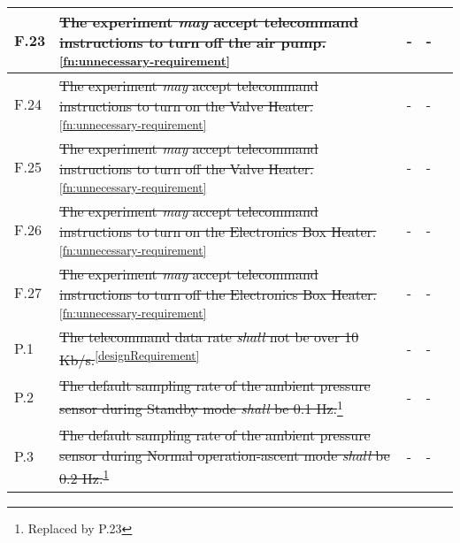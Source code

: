 \begin{longtable}[]{|m{}| m{} |m{} |m{}|m{}|}
F.23 & \st{The experiment \textit{may} accept telecommand instructions to turn off the air pump.}\textsuperscript{\ref{fn:unnecessary-requirement}}                                                                                             &      -       & -            &        \\ \hline
F.24 & \st{The experiment \textit{may} accept telecommand instructions to turn on the Valve Heater.}\textsuperscript{\ref{fn:unnecessary-requirement}}                                                                                          &      -        & -            &        \\ \hline
F.25 & \st{The experiment \textit{may} accept telecommand instructions to turn off the Valve Heater.}\textsuperscript{\ref{fn:unnecessary-requirement}}                                                                                         &      -        & -            &        \\ \hline
F.26 & \st{The experiment \textit{may} accept telecommand instructions to turn on the Electronics Box Heater.}\textsuperscript{\ref{fn:unnecessary-requirement}}                                                                                     &      -        & -            &        \\ \hline
F.27 & \st{The experiment \textit{may} accept telecommand instructions to turn off the Electronics Box Heater.}\textsuperscript{\ref{fn:unnecessary-requirement}}                                                                                    &      -        & -            &        \\ \hline
P.1  & \st{The telecommand data rate \textit{shall} not be over 10 Kb/s.}\textsuperscript{\ref{designRequirement}}                                                                                                                           &        -      & -          &        \\ \hline
P.2  & \st{The default sampling rate of the ambient pressure sensor during Standby mode \textit{shall} be 0.1 Hz.}\footnote{Replaced by P.23\label{replaceSoftVeri}}                                                                       &      -  & -  &        \\ \hline
P.3  & \st{The default sampling rate of the ambient pressure sensor during Normal operation-ascent mode \textit{shall} be 0.2 Hz.}\textsuperscript{\ref{replaceSoftVeri}}                                                           &    -        & -        &        \\ \hline

\end{longtable}
